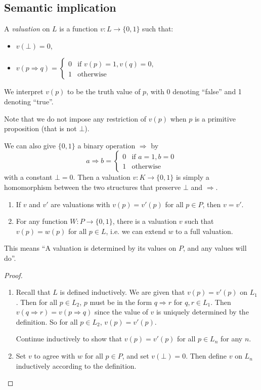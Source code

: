 \documentclass[a4paper]{article}
\begin{document}
\subsection{Semantic implication}
\begin{defi}[Valuation]
  A \emph{valuation} on $L$ is a function $v: L\to \{0, 1\}$ such that:
  \begin{itemize}
  \item $v(\bot) = 0$,
  \item $v(p\Rightarrow q) = \begin{cases} 0 & \text{if }v(p) = 1, v(q) = 0,\\1 & \text{otherwise}\end{cases}$
  \end{itemize}
  We interpret $v(p)$ to be the truth value of $p$, with 0 denoting ``false'' and 1 denoting ``true''.

  Note that we do not impose any restriction of $v(p)$ when $p$ is a primitive proposition (that is not $\bot$).
\end{defi}

We can also give $\{0, 1\}$ a binary operation $\Rightarrow$ by
\[
  a\Rightarrow b = \begin{cases}
    0 & \text{if }a = 1, b = 0\\
    1 & \text{otherwise}
  \end{cases}
\]
with a constant $\bot = 0$. Then a valuation $v: K\to \{0, 1\}$ is simply a homomorphism between the two structures that preserve $\bot$ and $\Rightarrow $.

\begin{prop}\leavevmode
  \begin{enumerate}
    \item If $v$ and $v'$ are valuations with $v(p) = v'(p)$ for all $p\in P$, then $v = v'$.
    \item For any function $W: P \to \{0, 1\}$, there is a valuation $v$ such that $v(p) = w(p)$ for all $p\in L$, i.e. we can extend $w$ to a full valuation.
  \end{enumerate}
  This means ``A valuation is determined by its values on $P$, and any values will do''.
\end{prop}

\begin{proof}
  \begin{enumerate}
    \item Recall that $L$ is defined inductively. We are given that $v(p) = v'(p)$ on $L_1$. Then for all $p\in L_2$, $p$ must be in the form $q\Rightarrow r$ for $q, r\in L_1$. Then $v(q\Rightarrow r) = v(p\Rightarrow q)$ since the value of $v$ is uniquely determined by the definition. So for all $p\in L_2$, $v(p) = v'(p)$.

      Continue inductively to show that $v(p) = v'(p)$ for all $p\in L_n$ for any $n$.
    
    \item Set $v$ to agree with $w$ for all $p\in P$, and set $v(\bot) = 0$. Then define $v$ on $L_n$ inductively according to the definition.
  \end{enumerate}
\end{proof}
\end{document}
